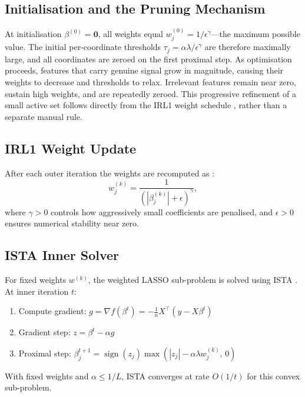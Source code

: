 \documentclass[12pt,a4paper]{article}
\DeclareMathOperator{\sign}{sign}
\newcommand{\abs}[1]{\left|#1\right|}
\begin{document}
\subsection{Initialisation and the Pruning Mechanism}

At initialisation $\beta^{(0)} = \mathbf{0}$, all weights equal
$w_j^{(0)} = 1/\epsilon^\gamma$---the maximum possible value.  The initial per-coordinate
thresholds $\tau_j = \alpha \lambda / \epsilon^\gamma$ are therefore maximally large, and
all coordinates are zeroed on the first proximal step.  As optimisation proceeds, features
that carry genuine signal grow in magnitude, causing their weights to decrease and
thresholds to relax.  Irrelevant features remain near zero, sustain high weights, and are
repeatedly zeroed.  This progressive refinement of a small active set follows directly
from the IRL1 weight schedule \citep{wipf2011}, rather than a separate manual rule.

\subsection{IRL1 Weight Update}

After each outer iteration the weights are recomputed as \citep{candes2008}:
\begin{equation}
    w_j^{(k)} = \frac{1}{\left(\abs{\beta_j^{(k)}} + \epsilon\right)^\gamma},
    \label{eq:irl1_weights}
\end{equation}
where $\gamma > 0$ controls how aggressively small coefficients are penalised, and
$\epsilon > 0$ ensures numerical stability near zero.

\subsection{ISTA Inner Solver}

For fixed weights $w^{(k)}$, the weighted LASSO sub-problem is solved using ISTA
\citep{beck2009}.  At inner iteration $t$:
\begin{enumerate}[noitemsep]
    \item Compute gradient: $g = \nabla f(\beta^t) = -\frac{1}{n}X^\top(y - X\beta^t)$
    \item Gradient step: $z = \beta^t - \alpha g$
    \item Proximal step: $\beta^{t+1}_j = \sign(z_j)\max(\abs{z_j} - \alpha\lambda w_j^{(k)},\, 0)$
\end{enumerate}
With fixed weights and $\alpha \leq 1/L$, ISTA converges at rate $O(1/t)$ for this
convex sub-problem.
\end{document}
